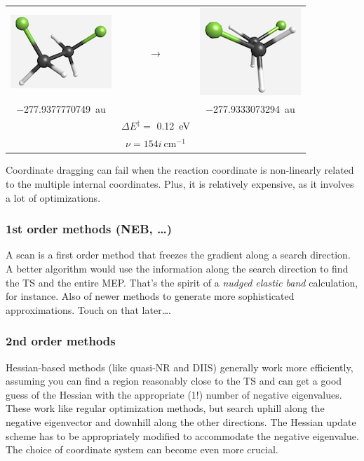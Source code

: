 \documentclass[11pt]{article}
\begin{document}
\begin{center}
\begin{tabular}{ccc}
\includegraphics{./Images/FCH2CH2F-gauche.png}
 & \(\longrightarrow\) & 
\includegraphics{./Images/FCH2CH2F-TS.png} \\
\SI{-277.9377770749}{au} &  & \SI{-277.9333073294}{au} \\
  &  \(\Delta E^\ddagger =\) \SI{0.12}{eV} &  \\
  &  \(\nu = 154i~\text{cm}^{-1}\) & \\
\end{tabular}
\end{center}

Coordinate dragging can fail when the reaction coordinate is non-linearly related to the multiple internal coordinates. Plus, it is relatively expensive, as it involves a lot of optimizations.
\subsubsection{1st order methods (NEB, \ldots{})}
\label{sec:org7b566ed}
A scan is a first order method that freezes the gradient along a search direction.  A better algorithm would use the information along the search direction to find the TS and the entire MEP.  That's the spirit of a \emph{nudged elastic band} calculation, for instance. Also of newer methods to generate more sophisticated approximations.   Touch on that later\ldots{}.
\subsubsection{2nd order methods}
\label{sec:org3b64ea2}
Hessian-based methods (like quasi-NR and DIIS) generally work more efficiently, assuming you can find a region reasonably close to the TS and can get a good guess of the Hessian with the appropriate (1!) number of negative eigenvalues.  These work like regular optimization methods, but search uphill along the negative eigenvector and downhill along the other directions.  The Hessian update scheme has to be appropriately modified to accommodate the negative eigenvalue.  The choice of coordinate system can become even more crucial.
\end{document}
